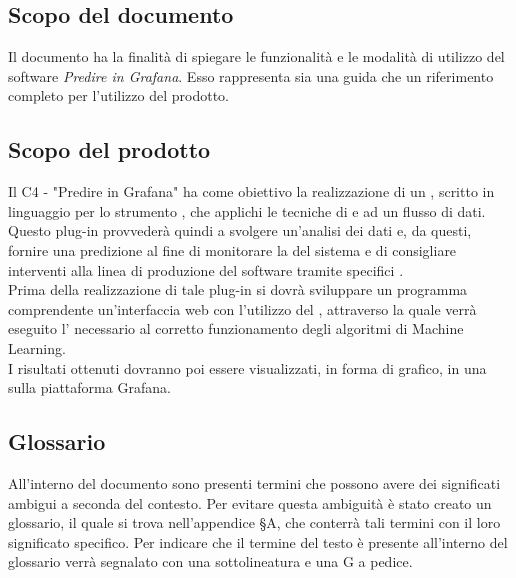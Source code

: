 \documentclass[../manuale-utente.tex]{subfiles}
\begin{document}
\subsection{Scopo del documento}%
\label{subs:scopo_del_documento}
Il documento ha la finalità di spiegare le funzionalità e le modalità di utilizzo del software \textit{Predire in Grafana}. Esso rappresenta sia una guida che un riferimento completo per l'utilizzo del prodotto.

\subsection{Scopo del prodotto}%
\label{subs:scopo_del_prodotto}
Il  C4 - "Predire in Grafana" ha come obiettivo la realizzazione di un , scritto in linguaggio  per lo strumento  , che applichi le tecniche di   e  ad un flusso di dati. Questo plug-in provvederà quindi a svolgere un'analisi dei dati e, da questi, fornire una predizione al fine di monitorare la  del sistema e di consigliare interventi alla linea di produzione del software tramite specifici . \\
Prima della realizzazione di tale plug-in si dovrà sviluppare un programma comprendente un'interfaccia web con l'utilizzo del  , attraverso la quale verrà eseguito l' necessario al corretto funzionamento degli algoritmi di Machine Learning. \\
I risultati ottenuti dovranno poi essere visualizzati, in forma di grafico, in una  sulla piattaforma Grafana.

\subsection{Glossario}
\label{subs:glossario}
All'interno del documento sono presenti termini che possono avere dei significati ambigui a seconda del contesto. Per evitare questa ambiguità è stato creato un glossario, il quale si trova nell'appendice §A, che conterrà tali termini con il loro significato specifico. Per indicare che il termine del testo è presente all'interno del glossario verrà segnalato con una sottolineatura e una G a pedice.
\end{document}
